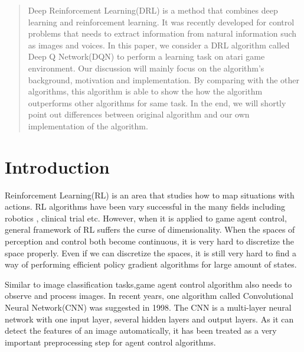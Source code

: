 \documentclass{article}
\begin{document}
 
\begin{abstract} 
Deep Reinforcement Learning(DRL) is a method that combines deep learning and reinforcement learning. It was recently developed for control problems that needs to extract information from natural information such as images and voices. In this paper, we consider a DRL algorithm called Deep Q Network(DQN) to perform a learning task on atari game environment. Our discussion will mainly focus on the algorithm's background, motivation and implementation. By comparing with the other algorithms, this algorithm is able to show the how the algorithm outperforms other algorithms for same task. In the end, we will shortly point out differences between original algorithm and our own implementation of the algorithm.
\end{abstract}
\section*{Introduction}
Reinforcement Learning(RL) is an area that studies how to map situations with actions\citep{barto1998reinforcement}. RL algorithms have been vary successful in the many fields including robotics \cite{kober2012reinforcement}, clinical trial \cite{kuleshov2010algorithms} etc. However, when it is applied to game agent control, general framework of RL suffers the curse of dimensionality. When the spaces of perception and control both become continuous, it is very hard to discretize the space properly. Even if we can discretize the spaces, it is still very hard to find a way of performing efficient policy gradient algorithms for large amount of states. 

Similar to image classification tasks,game agent control algorithm also needs to observe and process images. In recent years, one algorithm called Convolutional Neural Network(CNN) was suggested in 1998\cite{lecun1998gradient}. The CNN is a multi-layer neural network with one input layer, several hidden layers and output layers. As it can detect the features of an image automatically, it has been treated as a very important preprocessing step for agent control algorithms\cite{mnih2013playing}.
\end{document}
